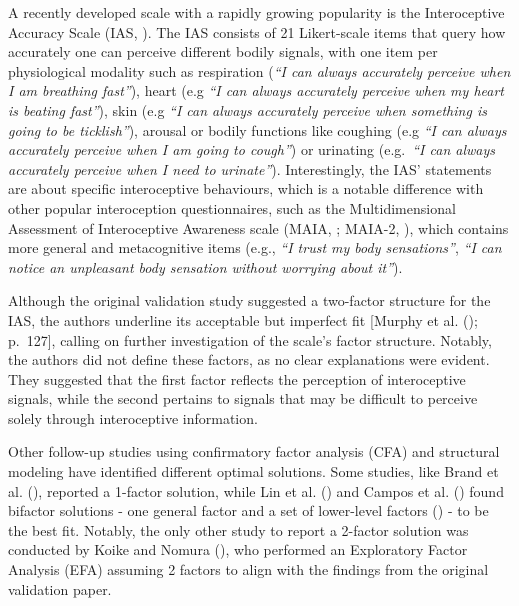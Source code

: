 \documentclass[
  man,
  floatsintext,
  longtable,
  nolmodern,
  notxfonts,
  notimes,
  colorlinks=true,linkcolor=blue,citecolor=blue,urlcolor=blue]{apa7}
\begin{document}
A recently developed scale with a rapidly growing popularity is the
Interoceptive Accuracy Scale (IAS, ). The IAS consists of 21 Likert-scale items that query how
accurately one can perceive different bodily signals, with one item per
physiological modality such as respiration (\emph{``I can always
accurately perceive when I am breathing fast''}), heart (e.g \emph{``I
can always accurately perceive when my heart is beating fast''}), skin
(e.g \emph{``I can always accurately perceive when something is going to
be ticklish''}), arousal or bodily functions like coughing (e.g
\emph{``I can always accurately perceive when I am going to cough''}) or
urinating (e.g.~\emph{``I can always accurately perceive when I need to
urinate''}). Interestingly, the IAS' statements are about specific
interoceptive behaviours, which is a notable difference with other
popular interoception questionnaires, such as the Multidimensional
Assessment of Interoceptive Awareness scale (MAIA,
; MAIA-2,
), which
contains more general and metacognitive items (e.g., \emph{``I trust my
body sensations''}, \emph{``I can notice an unpleasant body sensation
without worrying about it''}).

Although the original validation study suggested a two-factor structure
for the IAS, the authors underline its acceptable but imperfect fit
{[}Murphy et al. (); p.~127{]}, calling
on further investigation of the scale's factor structure. Notably, the
authors did not define these factors, as no clear explanations were
evident. They suggested that the first factor reflects the perception of
interoceptive signals, while the second pertains to signals that may be
difficult to perceive solely through interoceptive information.

Other follow-up studies using confirmatory factor analysis (CFA) and
structural modeling have identified different optimal solutions. Some
studies, like Brand et al. (), reported a
1-factor solution, while Lin et al. () and
Campos et al. () found bifactor solutions
- one general factor and a set of lower-level factors
() - to be
the best fit. Notably, the only other study to report a 2-factor
solution was conducted by Koike and Nomura
(), who performed an Exploratory Factor
Analysis (EFA) assuming 2 factors to align with the findings from the
original validation paper.
\end{document}
